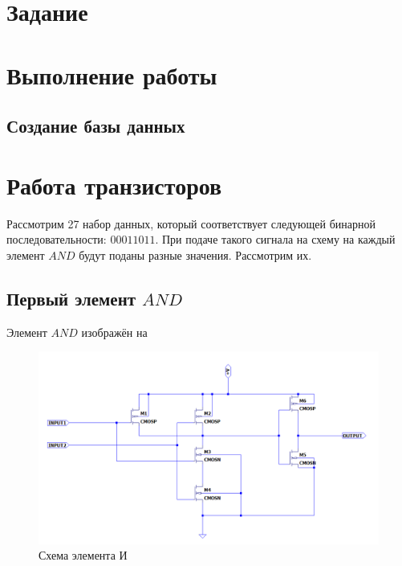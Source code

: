 \documentclass[a4paper,14pt]{article}
\begin{document}

\tableofcontents
\pagebreak

\section{Задание}

\section{Выполнение работы}

\subsection{Создание базы данных}

\section{Работа транзисторов}

Рассмотрим 27 набор данных, который соответствует следующей бинарной последовательности: $0	0	0	1	1	0	1	1$. При подаче такого сигнала на схему на каждый элемент $AND$ будут поданы разные значения. Рассмотрим их.

	\subsection{Первый элемент $AND$}
	
	Элемент $AND$ изображён на 
		
	\begin{figure}[H]
		\centering		
		\includegraphics[width=\linewidth]{image/schema_and}
		\caption{Схема элемента И}\label{img:schema_and}
	\end{figure}
	
\end{document}
